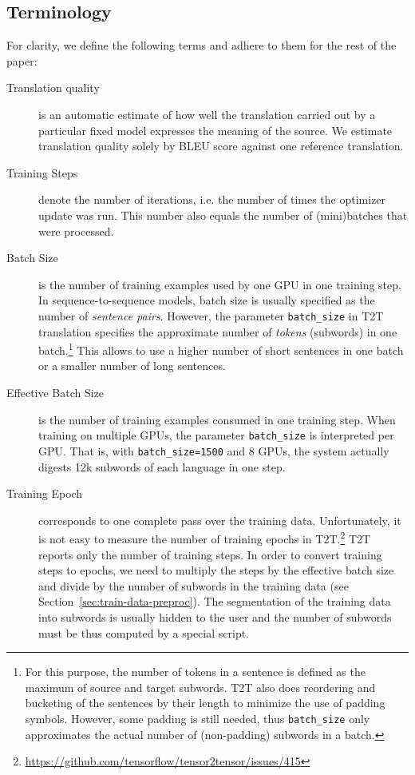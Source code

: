 \documentclass{pbmlarxiv} \pdfoutput=1
\def\footurl#1{\footnote{\url{#1}}}
\def\Sref#1{Section~\ref{#1}}
\begin{document}
\subsection{Terminology}\label{sec:terminology}

For clarity, we define the following terms and adhere to them for the rest of
the paper:
\label{terms}

\begin{description}
\item[Translation quality] is an automatic estimate of how well the translation
carried out by a particular fixed model expresses the meaning of the source. We
estimate translation quality solely by BLEU score against one reference
translation.

\item[Training Steps] denote the number of iterations, i.e. the number of times
the optimizer update was run. This number also equals the number of (mini)batches that
were processed.

\item[Batch Size] is the number of training examples used by one GPU in one training step.
In sequence-to-sequence models, batch size is usually specified as the number of \emph{sentence pairs}.
However, the parameter \verb|batch_size| in T2T translation specifies the 
 approximate number of \emph{tokens} (subwords) in one batch.\footnote{
  For this purpose, the number of tokens in a sentence is defined
   as the maximum of source and target subwords.
  T2T also does reordering and bucketing of the sentences by their length
   to minimize the use of padding symbols.
  However, some padding is still needed, thus \texttt{batch\_size} only approximates
   the actual number of (non-padding) subwords in a batch.
 }
This allows to use a higher number of short sentences in one batch
 or a smaller number of long sentences.

\item[Effective Batch Size] is the number of training examples consumed in one training
step.
When training on multiple GPUs, the parameter \verb|batch_size| is interpreted per GPU.
That is, with \verb|batch_size=1500| and 8 GPUs, the system actually digests
12k subwords of each language in one step.

\item[Training Epoch] corresponds to one complete pass over the training data.
Unfortunately, it is not easy to measure the number of training epochs in
T2T.\footurl{https://github.com/tensorflow/tensor2tensor/issues/415}
T2T reports only the number of training steps.
In order to convert training steps to epochs,
 we need to multiply the steps by the effective batch size
 and divide by the number of subwords in the training data (see \Sref{sec:train-data-preproc}).
The segmentation of the training data into subwords is usually hidden to the user
 and the number of subwords must be thus computed by a special script.


\end{description}
\end{document}
